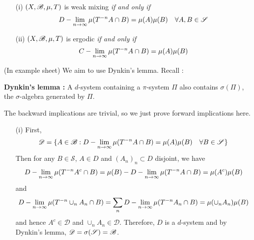 \documentclass[10pt,a4paper]{report}
\newenvironment{proof}
{\begin{changemargin}{1cm}{0.5cm} 
	}%
	{\end{changemargin}
}
\newenvironment{subproof}
{\begin{changemargin}{0.5cm}{0.5cm}
	}%
	{\end{changemargin}
}
\begin{document}
\begin{itemize}
\item[(i)] $(X,\mathscr{B}, \mu, T)$ is weak mixing \emph{if and only if}
\begin{align*}
D-\lim_{n\rightarrow \infty} \mu(T^{-n} A \cap B) = \mu(A) \mu(B) \quad \forall A,B \in \mathscr{S}
\end{align*}
\item[(ii)] $(X,\mathscr{B}, \mu, T)$ is ergodic \emph{if and only if}
\begin{align*}
C-\lim_{n\rightarrow \infty} \mu(T^{-n}A \cap B) = \mu(A) \mu(B)
\end{align*}
\end{itemize}
\begin{proof}
\pf (In example sheet) We aim to use Dynkin's lemma. Recall :
\begin{subproof}
\textbf{Dynkin's lemma :} A $d$-system containing a $\pi$-system $\Pi$ also contains $\sigma(\Pi)$, the $\sigma$-algebra generated by $\Pi$.
\end{subproof}
The backward implications are trivial, so we just prove forward implications here.
\begin{itemize}
\item[(i)] First,
\begin{align*}
\mathscr{D} = \{A\in \mathscr{B} : D-\lim_{n\rightarrow \infty} \mu(T^{-n} A \cap B) = \mu(A) \mu(B) \quad \forall B\in \mathscr{S} \}
\end{align*}
Then for any $B\in \mathscr{S}$, $A\in D$ and $(A_n)_{n} \subset D$ disjoint, we have
\begin{align*}
D-\lim_{n\rightarrow \infty} \mu(T^{-n} A^c \cap B) = \mu(B) - D-\lim_{n\rightarrow \infty} \mu(T^{-n} A \cap B) = \mu(A^c) \mu(B)
\end{align*}
and
\begin{align*}
D-\lim_{n\rightarrow \infty} \mu(T^{-n} \cup_n A_n \cap B) = \sum_n D-\lim_{n\rightarrow \infty} \mu(T^{-n} A_n \cap B) = \mu(\cup_n A_n) \mu(B)
\end{align*}
and hence $A^c \in \mathscr{D}$ and $\cup_n A_n \in \mathscr{D}$. Therefore, $D$ is a $d$-system and by Dynkin's lemma, $\mathscr{D} = \sigma(\mathscr{S}) = \mathscr{B}$.


\end{itemize}
\end{proof}
\end{document}
